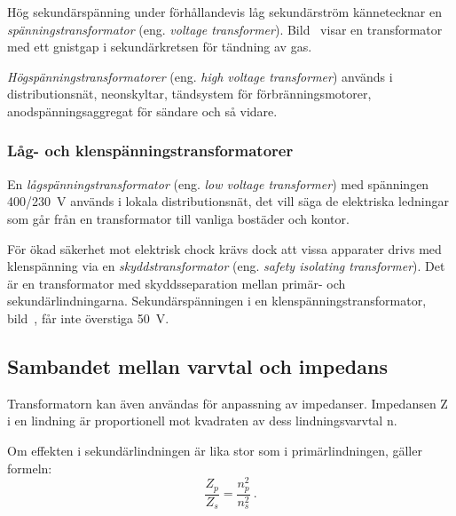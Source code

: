 Hög sekundärspänning under förhållandevis låg sekundärström kännetecknar en
\emph{spänningstransformator} (eng. \emph{voltage transformer}).
Bild~ visar en transformator med ett gnistgap i
sekundärkretsen för tändning av gas.

\emph{Högspänningstransformatorer} (eng. \emph{high voltage transformer})
används i distributionsnät, neonskyltar, tändsystem för förbränningsmotorer,
anodspänningsaggregat för sändare och så vidare.


\subsubsection{Låg- och klenspänningstransformatorer}


En \emph{lågspänningstransformator} (eng. \emph{low voltage transformer}) med
spänningen 400/\qty{230}{\volt} används i lokala distributionsnät, det vill säga
de elektriska ledningar som går från en transformator till vanliga bostäder och
kontor.

För ökad säkerhet mot elektrisk chock krävs dock att vissa apparater drivs med
klenspänning via en \emph{skyddstransformator}
(eng. \emph{safety isolating transformer}).
Det är en transformator med skyddsseparation mellan primär- och
sekundärlindningarna.
Sekundärspänningen i en klenspänningstransformator,
bild~, får inte överstiga \qty{50}{\volt}.

\newpage
\subsection{Sambandet mellan varvtal och impedans}


Transformatorn kan även användas för anpassning av impedanser.
Impedansen Z i en lindning är proportionell mot kvadraten av dess
lindningsvarvtal n.

Om effekten i sekundärlindningen är lika stor som i primärlindningen, gäller
formeln:
%
\[\dfrac{Z_p}{Z_s} = \dfrac{n_p^2}{n_s^2}~.\]

